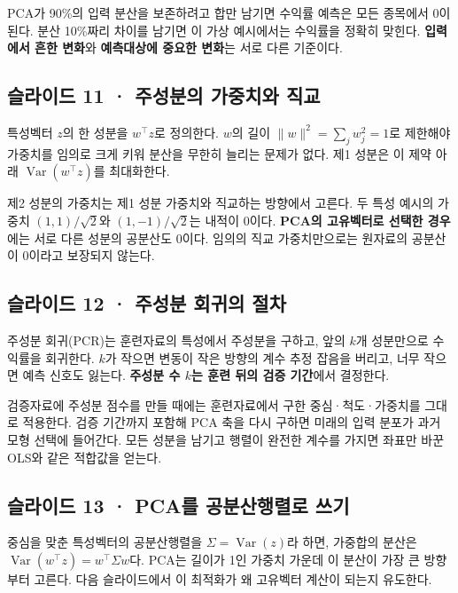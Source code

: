 \documentclass[11pt,a4paper]{article}
\begin{document}
PCA가 90\%의 입력 분산을 보존하려고 합만 남기면 수익률 예측은 모든 종목에서 0이 된다. 분산 10\%짜리 차이를 남기면 이 가상 예시에서는 수익률을 정확히 맞힌다. \textbf{입력에서 흔한 변화}와 \textbf{예측대상에 중요한 변화}는 서로 다른 기준이다.\par

\subsection{슬라이드 11 · 주성분의 가중치와 직교}
특성벡터 $z$의 한 성분을 $w^\top z$로 정의한다. $w$의 길이 $\|w\|^2=\sum_jw_j^2=1$로 제한해야 가중치를 임의로 크게 키워 분산을 무한히 늘리는 문제가 없다. 제1 성분은 이 제약 아래 $\operatorname{Var}(w^\top z)$를 최대화한다.\par

제2 성분의 가중치는 제1 성분 가중치와 직교하는 방향에서 고른다. 두 특성 예시의 가중치 $(1,1)/\sqrt2$와 $(1,-1)/\sqrt2$는 내적이 0이다. \textbf{PCA의 고유벡터로 선택한 경우}에는 서로 다른 성분의 공분산도 0이다. 임의의 직교 가중치만으로는 원자료의 공분산이 0이라고 보장되지 않는다.\par

\subsection{슬라이드 12 · 주성분 회귀의 절차}
주성분 회귀(PCR)는 훈련자료의 특성에서 주성분을 구하고, 앞의 $k$개 성분만으로 수익률을 회귀한다. $k$가 작으면 변동이 작은 방향의 계수 추정 잡음을 버리고, 너무 작으면 예측 신호도 잃는다. \textbf{주성분 수 $k$는 훈련 뒤의 검증 기간}에서 결정한다.\par

검증자료에 주성분 점수를 만들 때에는 훈련자료에서 구한 중심·척도·가중치를 그대로 적용한다. 검증 기간까지 포함해 PCA 축을 다시 구하면 미래의 입력 분포가 과거 모형 선택에 들어간다. 모든 성분을 남기고 행렬이 완전한 계수를 가지면 좌표만 바꾼 OLS와 같은 적합값을 얻는다.\par

\subsection{슬라이드 13 · PCA를 공분산행렬로 쓰기}
중심을 맞춘 특성벡터의 공분산행렬을 $\Sigma=\operatorname{Var}(z)$라 하면, 가중합의 분산은 $\operatorname{Var}(w^\top z)=w^\top\Sigma w$다. PCA는 길이가 1인 가중치 가운데 이 분산이 가장 큰 방향부터 고른다. 다음 슬라이드에서 이 최적화가 왜 고유벡터 계산이 되는지 유도한다.\par
\end{document}
